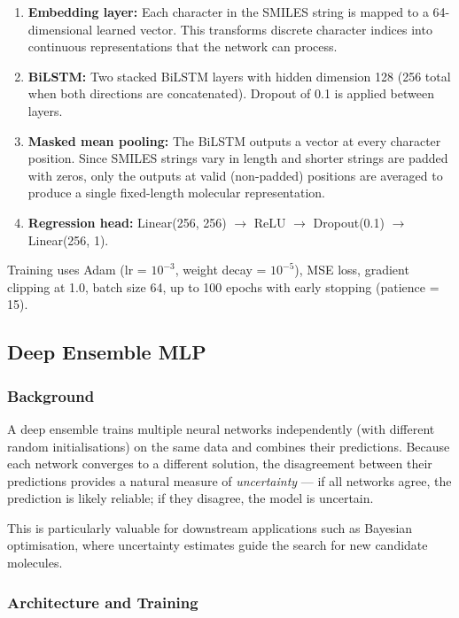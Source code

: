 \documentclass[11pt,a4paper]{article}
\begin{document}
\begin{enumerate}
    \item \textbf{Embedding layer:} Each character in the SMILES string is mapped to a 64-dimensional learned vector. This transforms discrete character indices into continuous representations that the network can process.
    \item \textbf{BiLSTM:} Two stacked BiLSTM layers with hidden dimension 128 (256 total when both directions are concatenated). Dropout of 0.1 is applied between layers.
    \item \textbf{Masked mean pooling:} The BiLSTM outputs a vector at every character position. Since SMILES strings vary in length and shorter strings are padded with zeros, only the outputs at valid (non-padded) positions are averaged to produce a single fixed-length molecular representation.
    \item \textbf{Regression head:} Linear(256, 256) $\rightarrow$ ReLU $\rightarrow$ Dropout(0.1) $\rightarrow$ Linear(256, 1).
\end{enumerate}

Training uses Adam (lr = $10^{-3}$, weight decay = $10^{-5}$), MSE loss, gradient clipping at 1.0, batch size 64, up to 100 epochs with early stopping (patience = 15).

\subsection{Deep Ensemble MLP}

\subsubsection*{Background}

A deep ensemble trains multiple neural networks independently (with different random initialisations) on the same data and combines their predictions. Because each network converges to a different solution, the disagreement between their predictions provides a natural measure of \emph{uncertainty} --- if all networks agree, the prediction is likely reliable; if they disagree, the model is uncertain.

This is particularly valuable for downstream applications such as Bayesian optimisation, where uncertainty estimates guide the search for new candidate molecules.

\subsubsection*{Architecture and Training}
\end{document}
